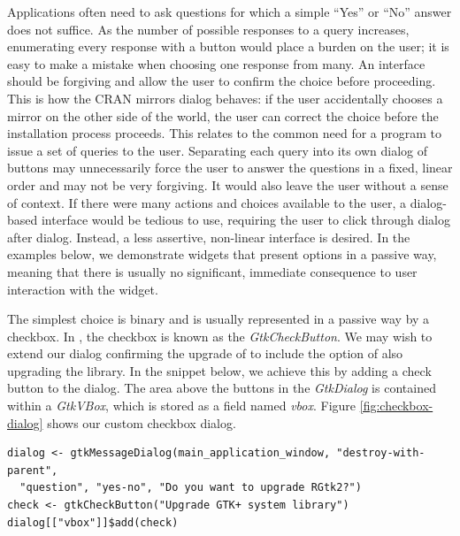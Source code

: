 \documentclass[article]{jss}
\begin{document}
Applications often need to ask questions for which a simple ``Yes'' or ``No''
answer does not suffice. As the number of possible responses to a query increases, 
enumerating every response with a button would place a burden on the user;
it is easy to make a mistake when choosing one response from many. An interface
should be forgiving and allow the user to confirm the choice before proceeding.
This is how the CRAN mirrors dialog behaves: if the user accidentally chooses a 
mirror on the other side of the world, the user can correct the choice before
the installation process proceeds. This relates to the common need for a program 
to issue a set of queries to the user. Separating each query into its own dialog
of buttons may unnecessarily force the user to answer the questions in a 
fixed, linear order and may not be very forgiving. It would also leave
the user without a sense of context. If there were many actions
and choices available to the user, a dialog-based interface would be tedious to 
use, requiring the user to click through dialog after dialog. Instead, a less 
assertive, non-linear interface is desired. In the examples below, we
demonstrate widgets that present options in a passive way, meaning that
there is usually no significant, immediate consequence to user interaction 
with the widget.

The simplest choice is binary and is usually represented in a passive way 
by a checkbox. In , the checkbox is known as
the \emph{GtkCheckButton}. We may wish to extend our dialog confirming the
upgrade of  to include the option of also upgrading the  
library. In the snippet below, we achieve this by adding a check button to the dialog. 
The area above the buttons in the \emph{GtkDialog} is contained within a 
\emph{GtkVBox}, which is stored as a field named \emph{vbox}. Figure 
\ref{fig:checkbox-dialog} shows our custom checkbox dialog.
\begin{verbatim}
dialog <- gtkMessageDialog(main_application_window, "destroy-with-parent", 
  "question", "yes-no", "Do you want to upgrade RGtk2?")
check <- gtkCheckButton("Upgrade GTK+ system library")
dialog[["vbox"]]$add(check)
\end{verbatim}
\end{document}
